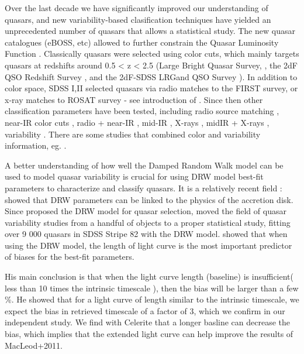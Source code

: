 \documentclass[modern]{aastex62}
\begin{document}
Over the last decade we have significantly improved our understanding of quasars, and new variability-based clasification techniques \citep{fan2001, richards2006, kozlowski2010, palanque2011, macleod2011, graham2014, alsayyad2016, ruan2017} have yielded an unprecedented number of quasars that allows a statistical study. The new quasar catalogues (eBOSS, etc) allowed  to further constrain the Quasar Luminosity Function \citep{ross2013, myers2015, palanque2016}. Classically quasars were selected using color cuts,  which mainly targets quasars at redshifts around 0.5 < z < 2.5 (Large Bright Quasar Survey, \cite{hewett1995}, the 2dF QSO Redshift Survey \cite{croom2004}, and the 2dF-SDSS LRGand QSO Survey \cite{croom2009}).  In addition to color space, SDSS I,II selected quasars via radio matches to the FIRST survey, or x-ray matches to ROSAT survey  - see introduction of \citep{myers2015}. Since then other classification parameters have been tested, including radio source matching \citep{mcgreer2009}, near-IR color cuts \citep{banerji2012},  radio + near-IR \citep{glikman2012}, mid-IR \citep{stern2005, richards2009a, stern2012}, X-rays \citep{trichas2012},  midIR + X-rays \citep{lacy2004, hickox2007, hickox2009}, variability \citep{schmidt2010, butler2011, macleod2011, palanque2011}. There are some studies that combined color and variability information, eg. \cite{tie2017, peters2015, sesar2007}. 

 
A better understanding of how well the Damped Random Walk model can be used to model quasar variability is crucial for using DRW model best-fit parameters to characterize and classify quasars. It is a relatively recent field : \cite{kelly2009} showed that DRW parameters can be linked to the physics of the accretion disk. Since \cite{kozlowski2010} proposed the DRW model for quasar selection, \cite{macleod2010} moved the field of quasar variability studies from a handful of objects to a proper statistical study, fitting over 9 000 quasars in SDSS Stripe 82 with the DRW model. \cite{kozlowski2017a} showed that when using the  DRW model, the length of light curve is the most important predictor of biases for the best-fit parameters. 

His main conclusion is that when the light curve length (baseline) is insufficient( less than 10 times the intrinsic timescale ), then the bias will be larger than a few \%. He showed that for a light curve of length similar to the intrinsic timescale, we expect the bias in retrieved timescale of a factor of 3, which we confirm in our independent study.  We find with Celerite that a longer basline can decrease the bias, which implies that the extended light curve can help improve the results of MacLeod+2011.  
\end{document}
